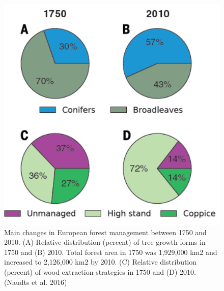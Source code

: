 \documentclass[12pt,oneside]{book}
\begin{document}
\begin{figure}

{\centering \includegraphics[width=0.8\linewidth]{figures/chap8/f816_naudts1} 

}

\caption{Main changes in European forest management between 1750 and 2010. (A) Relative distribution (percent) of tree growth forms in 1750 and (B) 2010. Total forest area in 1750 was 1,929,000 km2 and increased to 2,126,000 km2 by 2010. (C) Relative distribution (percent) of wood extraction strategies in 1750 and (D) 2010. (Naudts et al. 2016)}\label{fig:f816}
\end{figure}
\end{document}
